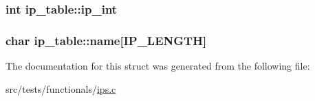 \subsubsection[{\texorpdfstring{ip\+\_\+int}{ip_int}}]{\setlength{\rightskip}{0pt plus 5cm}int ip\+\_\+table\+::ip\+\_\+int}\hypertarget{structip__table_a164501eaaa381a490d1b477b6202a3f4}{}\label{structip__table_a164501eaaa381a490d1b477b6202a3f4}
\subsubsection[{\texorpdfstring{name}{name}}]{\setlength{\rightskip}{0pt plus 5cm}char ip\+\_\+table\+::name\mbox{[}{\bf I\+P\+\_\+\+L\+E\+N\+G\+TH}\mbox{]}}\hypertarget{structip__table_ad4659ea0a72b02aa01df50d759fa5954}{}\label{structip__table_ad4659ea0a72b02aa01df50d759fa5954}


The documentation for this struct was generated from the following file\+:\begin{DoxyCompactItemize}
\item 
src/tests/functionals/\hyperlink{ips_8c}{ips.\+c}\end{DoxyCompactItemize}
